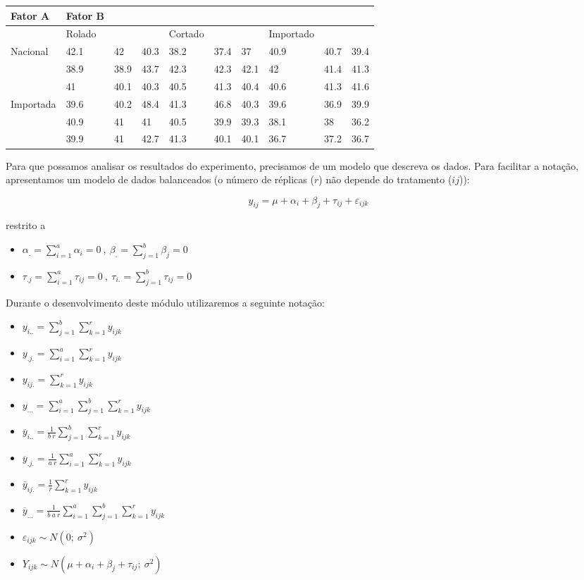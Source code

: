 \documentclass[
]{book}
\providecommand{\tightlist}{%
  \setlength{\itemsep}{0pt}\setlength{\parskip}{0pt}}
\begin{document}
\begin{longtable}[]{@{}llllllllll@{}}
\toprule
Fator A & Fator B & & & & & & & & \\
\midrule
\endhead
& Rolado & & & Cortado & & & Importado & & \\
Nacional & 42.1 & 42 & 40.3 & 38.2 & 37.4 & 37 & 40.9 & 40.7 & 39.4 \\
& 38.9 & 38.9 & 43.7 & 42.3 & 42.3 & 42.1 & 42 & 41.4 & 41.3 \\
& 41 & 40.1 & 40.3 & 40.5 & 41.3 & 40.4 & 40.6 & 41.3 & 41.6 \\
Importada & 39.6 & 40.2 & 48.4 & 41.3 & 46.8 & 40.3 & 39.6 & 36.9 & 39.9 \\
& 40.9 & 41 & 41 & 40.5 & 39.9 & 39.3 & 38.1 & 38 & 36.2 \\
& 39.9 & 41 & 42.7 & 41.3 & 40.1 & 40.1 & 36.7 & 37.2 & 36.7 \\
\bottomrule
\end{longtable}

Para que possamos analisar os resultados do experimento, precisamos de um modelo que descreva os dados. Para facilitar a notação, apresentamos um modelo de dados balanceados (o número de réplicas (\(r\)) não depende do tratamento (\(ij\))):

\[y_{ij}=\mu +\alpha_i+\beta_j+\tau_{ij}+\varepsilon_{ijk}\]

restrito a

\begin{itemize}
\tightlist
\item
  \(\alpha_{.}=\sum_{i=1}^{a}\alpha_i=0~,~\beta_{.}=\sum_{j=1}^{b}\beta_j=0\)
\item
  \(\tau_{.j}=\sum_{i=1}^{a}\tau_{ij}=0~,~\tau_{i.}=\sum_{j=1}^{b}\tau_{ij}=0\)
\end{itemize}

Durante o desenvolvimento deste módulo utilizaremos a seguinte notação:

\begin{itemize}
\tightlist
\item
  \(y_{i..} = \sum_{j=1}^{b}\sum_{k=1}^{r}y_{ijk}\)
\item
  \(y_{.j.}=\sum_{i=1}^{a}\sum_{k=1}^{r}y_{ijk}\)
\item
  \(y_{ij.}=\sum_{k=1}^{r}y_{ijk}\)
\item
  \(y_{...}=\sum_{i=1}^{a}\sum_{j=1}^{b}\sum_{k=1}^{r}y_{ijk}\)
\item
  \(\overline{y}_{i..}=\frac{1}{b~r}\sum_{j=1}^{b}\sum_{k=1}^{r}y_{ijk}\)
\item
  \(\overline{y}_{.j.}=\frac{1}{a~r}\sum_{i=1}^{a}\sum_{k=1}^{r}y_{ijk}\)
\item
  \(\overline{y}_{ij.}=\frac{1}{r}\sum_{k=1}^{r}y_{ijk}\)
\item
  \(\overline{y}_{...}=\frac{1}{b~a~r}\sum_{i=1}^{a}\sum_{j=1}^{b}\sum_{k=1}^{r}y_{ijk}\)
\item
  \(\varepsilon_{ijk}\sim N(0;~\sigma^2)\)
\item
  \(Y_{ijk}\sim N(\mu +\alpha_i+\beta_j+\tau_{ij};~\sigma^2)\)
\end{itemize}
\end{document}
